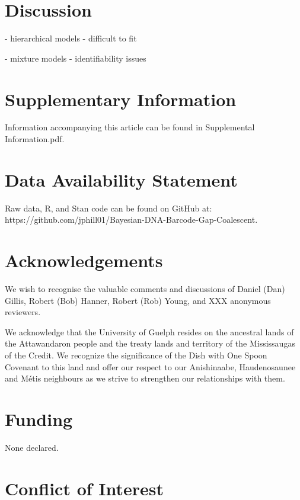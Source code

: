 \documentclass[12pt]{article}
\begin{document}
\section{Discussion}

- hierarchical models - difficult to fit

- mixture models - identifiability issues

\newpage

\section*{Supplementary Information}

Information accompanying this article can be found in Supplemental Information.pdf.

\section*{Data Availability Statement}

Raw data, R, and Stan code can be found on GitHub at: \\ https://github.com/jphill01/Bayesian-DNA-Barcode-Gap-Coalescent.

\section*{Acknowledgements}

We wish to recognise the valuable comments and discussions of Daniel (Dan) Gillis, Robert (Bob) Hanner, Robert (Rob) Young, and XXX anonymous reviewers.

We acknowledge that the University of Guelph resides on the ancestral lands of the Attawandaron people and the treaty lands and territory of the Mississaugas of the Credit. We recognize the significance of the Dish with One Spoon Covenant to this land and offer our respect to our Anishinaabe, Haudenosaunee and M{\'e}tis neighbours as we strive to strengthen our relationships with them.

\section*{Funding}

None declared.

\section*{Conflict of Interest}
\end{document}
